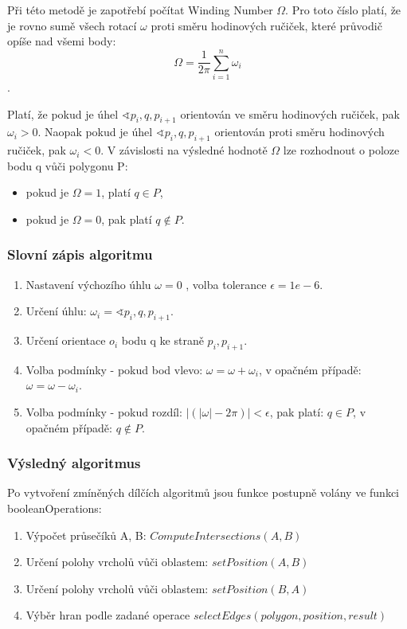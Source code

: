\documentclass[a4paper,11pt,twoside]{article}
\begin{document}
\noindent Při této metodě je zapotřebí počítat Winding Number $\Omega$. Pro toto číslo platí, že je rovno sumě všech rotací $\omega$ proti směru hodinových ručiček, které průvodič opíše nad všemi body: 
$$ 
\Omega = \frac{1}{2\pi} \sum_{i=1}^n \omega_i
$$.

\noindent Platí, že pokud je úhel $\sphericalangle p_i, q, p_{i+1}$ orientován ve směru hodinových ručiček, pak $\omega_i > 0$.
Naopak pokud je úhel $\sphericalangle p_i, q, p_{i+1}$ orientován proti směru hodinových ručiček, pak $\omega_i < 0$.
V závislosti na výsledné hodnotě $\Omega$ lze rozhodnout o poloze bodu q vůči polygonu P:

\begin{itemize}
\item pokud je $\Omega = 1$, platí $q \in P$, 
\item pokud je $\Omega = 0$, pak platí $q { \not \in } P$.
\end{itemize}

\subsubsection{Slovní zápis algoritmu}
\begin{enumerate}
\item Nastavení výchozího úhlu $\omega = 0$ , volba tolerance $\epsilon = 1e-6$.
\item Určení úhlu: $\omega_i = \sphericalangle p_i, q, p_{i+1}$.
\item Určení orientace $o_i$ bodu q ke straně $p_i, p_{i+1}$.
\item Volba podmínky - pokud bod vlevo: $\omega = \omega + \omega_i$, v opačném případě: $\omega = \omega - \omega_i$.
\item Volba podmínky - pokud rozdíl: $|(|\omega| - 2\pi)| < \epsilon$, pak platí: $q \in P$, v opačném případě:  $ q { \not \in } P $.
\end{enumerate}

\subsubsection{Výsledný algoritmus}
Po vytvoření zmíněných dílčích algoritmů jsou funkce postupně volány ve funkci booleanOperations:
\begin{enumerate}
\item Výpočet průsečíků A, B: $ComputeIntersections(A, B)$
\item Určení polohy vrcholů vůči oblastem: $setPosition(A, B) $
\item Určení polohy vrcholů vůči oblastem: $setPosition(B, A) $
\item Výběr hran podle zadané operace $selectEdges(polygon, position, result)$
\end{enumerate}
\end{document}
